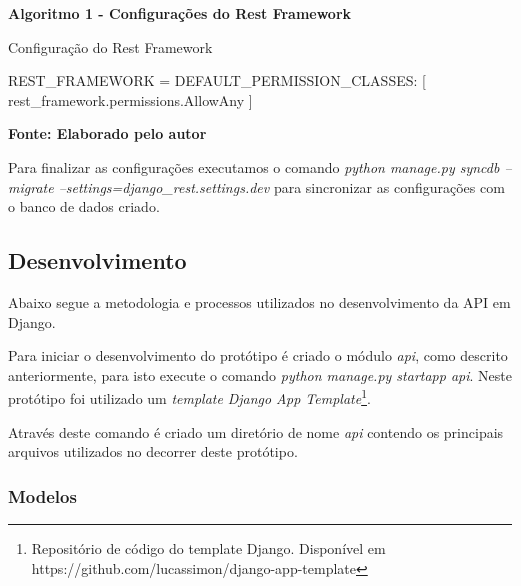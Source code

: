   \begin{center}	
    \textbf{Algoritmo 1 -  Configurações do Rest Framework}
    \vspace{-0.3cm}
    \begin{minipage}[ht]{13cm}
      \begin{algorithm}[H]
      \footnotesize
      \caption{Configuração do Rest Framework}
      \label{alg:conf_rest_framework}
	\begin{algorithmic}[1]
	  \STATE REST\_FRAMEWORK = { DEFAULT\_PERMISSION\_CLASSES: [ rest\_framework.permissions.AllowAny ] }
	\end{algorithmic}
      \end{algorithm}

      \small \centering \textbf{\footnotesize Fonte: Elaborado pelo autor}
    \end{minipage}
  \end{center}
  
  Para finalizar as configurações executamos o comando \textit{python manage.py syncdb --migrate --settings=django\_rest.settings.dev}
  para sincronizar as configurações com o banco de dados criado.
  
\subsection{Desenvolvimento}

  Abaixo segue a metodologia e processos utilizados no desenvolvimento da API em Django.
  
  Para iniciar o desenvolvimento do protótipo é criado o módulo \textit{api}, como descrito anteriormente,
  para isto execute o comando \textit{python manage.py startapp api}. Neste protótipo foi utilizado um \textit{template}
  \textit{Django App Template}\footnote[12]{Repositório de código do template Django. Disponível em https://github.com/lucassimon/django-app-template}.
  
  Através deste comando é criado um diretório de nome \textit{api} contendo os principais arquivos utilizados no decorrer deste protótipo.

\subsubsection{Modelos}

